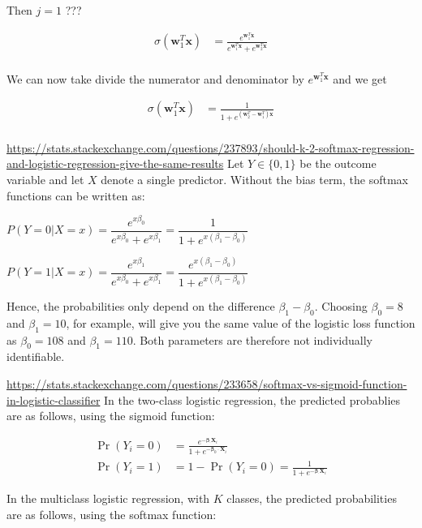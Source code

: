 \documentclass[a4paper]{article}
\begin{document}
Then $j = 1$ ???

\begin{align*}
\sigma(\mathbf{w}^T_1\mathbf{x}) &= \frac{e^{\mathbf{w}^T_1\mathbf{x}}}{e^{\mathbf{w}^T_1\mathbf{x}} + e^{\mathbf{w}^T_2\mathbf{x}}} \\
\end{align*}

We can now take divide the numerator and denominator by $e^{\mathbf{w}^T_1\mathbf{x}}$ and we get

\begin{align*}
\sigma(\mathbf{w}^T_1\mathbf{x}) &= \frac{1}{1 + e^{(\mathbf{w}^T_2-\mathbf{w}^T_1)\mathbf{x}}} \\
\end{align*}





\url{https://stats.stackexchange.com/questions/237893/should-k-2-softmax-regression-and-logistic-regression-give-the-same-results}
Let $Y \in \{0,1\}$ be the outcome variable and let $X$ denote a single predictor. Without the bias term, the softmax functions can be written as:

$P(Y=0|X=x) = \dfrac{e^{x\beta_0}}{e^{x \beta_0}+e^{x\beta_1}} = \dfrac{1}{1+e^{x(\beta_1-\beta_0)}}$

$P(Y=1|X=x) = \dfrac{e^{x\beta_1}}{e^{x \beta_0}+e^{x\beta_1}} = \dfrac{e^{x(\beta_1-\beta_0)}}{1+e^{x(\beta_1-\beta_0)}}$

Hence, the probabilities only depend on the difference $\beta_1 - \beta_0$. Choosing $\beta_0=8$ and $\beta_1=10$, for example, will give you the same value of the logistic loss function as $\beta_0=108$ and $\beta_1=110$. Both parameters are therefore not individually identifiable.


\url{https://stats.stackexchange.com/questions/233658/softmax-vs-sigmoid-function-in-logistic-classifier}
In the two-class logistic regression, the predicted probablies are as follows, using the sigmoid function:

\begin{align} \Pr(Y_i=0) &= \frac{e^{-\boldsymbol\beta_ \cdot \mathbf{X}_i}} {1 +e^{-\boldsymbol\beta_0 \cdot \mathbf{X}_i}} \, \\ \Pr(Y_i=1) &= 1 - \Pr(Y_i=0) = \frac{1} {1 +e^{-\boldsymbol\beta_ \cdot \mathbf{X}_i}} \end{align}

In the multiclass logistic regression, with $K$ classes, the predicted probabilities are as follows, using the softmax function:
\end{document}
